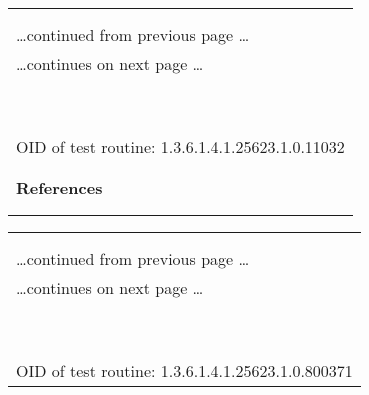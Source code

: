 \documentclass{article}
\begin{document}
\begin{longtable}{|p{}|}
\hline
\rowcolor{openvas_log}{\color{white}{Log (CVSS: 0.0) }}\\
\rowcolor{openvas_log}{\color{white}{NVT: Directory Scanner}}\\
\hline
\endfirsthead
\hfill\ldots continued from previous page \ldots \\
\hline
\endhead
\hline
\ldots continues on next page \ldots \\
\endfoot
\hline
\endlastfoot
\\
\rowcolor{white}{\verb=The following directories were discovered:=}\\
\rowcolor{white}{\verb=/docs, /examples=}\\
\rowcolor{white}{\verb=While this is not, in and of itself, a bug, you should manually inspect =}\\
\rowcolor{white}{\verb=these directories to ensure that they are in compliance with company=}\\
\rowcolor{white}{\verb=security standards=}\\
\rowcolor{white}{\verb==}\\
\rowcolor{white}{\verb==}\\
\\
OID of test routine: 1.3.6.1.4.1.25623.1.0.11032\\
\\

      \hline
      \\
\textbf{References}\\
\rowcolor{white}{\verb=Other:=}\\
\rowcolor{white}{\verb=  OWASP:OWASP-CM-006=}\\
\end{longtable}

\begin{longtable}{|p{}|}
\hline
\rowcolor{openvas_log}{\color{white}{Log (CVSS: 0.0) }}\\
\rowcolor{openvas_log}{\color{white}{NVT: Apache Tomcat Version Detection}}\\
\hline
\endfirsthead
\hfill\ldots continued from previous page \ldots \\
\hline
\endhead
\hline
\ldots continues on next page \ldots \\
\endfoot
\hline
\endlastfoot
\\
\rowcolor{white}{\verb=Detected Apache Tomcat version: 6.0.24=}\\
\rowcolor{white}{\verb=Location: 8080/tcp=}\\
\rowcolor{white}{\verb=CPE: cpe:/a:apache:tomcat:6.0.24=}\\
\rowcolor{white}{\verb=Concluded from version identification result:=}\\
\rowcolor{white}{\verb=Apache Tomcat/6.0.24=}\\
\rowcolor{white}{\verb==}\\
\rowcolor{white}{\verb==}\\
\\
OID of test routine: 1.3.6.1.4.1.25623.1.0.800371\\
\end{longtable}
\end{document}

